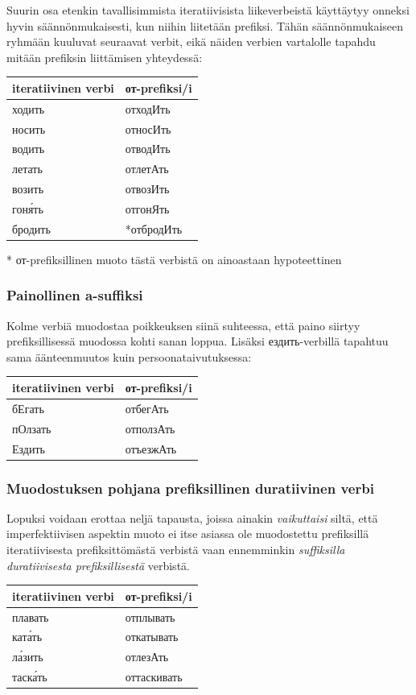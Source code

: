 \documentclass[]{scrartcl}
\begin{document}
Suurin osa etenkin tavallisimmista iteratiivisista liikeverbeistä
käyttäytyy onneksi hyvin säännönmukaisesti, kun niihin liitetään
prefiksi. Tähän säännönmukaiseen ryhmään kuuluvat seuraavat verbit, eikä
näiden verbien vartalolle tapahdu mitään prefiksin liittämisen
yhteydessä:

\begin{longtable}[c]{@{}ll@{}}
\toprule
iteratiivinen verbi & от-prefiksi/i\tabularnewline
\midrule
\endhead
ходить & отходИть\tabularnewline
носить & относИть\tabularnewline
водить & отводИть\tabularnewline
летать & отлетАть\tabularnewline
возить & отвозИть\tabularnewline
гоня́ть & отгонЯть\tabularnewline
бродить & *отбродИть\tabularnewline
\bottomrule
\end{longtable}

* от-prefiksillinen muoto tästä verbistä on ainoastaan hypoteettinen

\subsubsection{Painollinen a-suffiksi}\label{painollinen-a-suffiksi}

Kolme verbiä muodostaa poikkeuksen siinä suhteessa, että paino siirtyy
prefiksillisessä muodossa kohti sanan loppua. Lisäksi ездить-verbillä
tapahtuu sama äänteenmuutos kuin persoonataivutuksessa:

\begin{longtable}[c]{@{}ll@{}}
\toprule
iteratiivinen verbi & от-prefiksi/i\tabularnewline
\midrule
\endhead
бЕгать & отбегАть\tabularnewline
пОлзать & отползАть\tabularnewline
Ездить & отъезжАть\tabularnewline
\bottomrule
\end{longtable}

\subsubsection{Muodostuksen pohjana prefiksillinen duratiivinen
verbi}\label{muodostuksen-pohjana-prefiksillinen-duratiivinen-verbi}

Lopuksi voidaan erottaa neljä tapausta, joissa ainakin
\emph{vaikuttaisi} siltä, että imperfektiivisen aspektin muoto ei itse
asiassa ole muodostettu prefiksillä iteratiivisesta prefiksittömästä
verbistä vaan ennemminkin \emph{suffiksilla duratiivisesta
prefiksillisestä} verbistä.

\begin{longtable}[c]{@{}ll@{}}
\toprule
iteratiivinen verbi & от-prefiksi/i\tabularnewline
\midrule
\endhead
плавать & отплывать\tabularnewline
ката́ть & откатывать\tabularnewline
ла́зить & отлезАть\tabularnewline
таска́ть & оттаскивать\tabularnewline
\bottomrule
\end{longtable}
\end{document}
